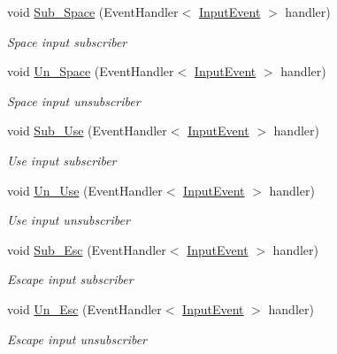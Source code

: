 \begin{DoxyCompactItemize}
void \mbox{\hyperlink{class_g_m_t_b_1_1_input_system_1_1_input___manager_a44d48f4c8117d99c53bed41b4baa08fd}{Sub\+\_\+\+Space}} (Event\+Handler$<$ \mbox{\hyperlink{class_g_m_t_b_1_1_input_system_1_1_input_event}{Input\+Event}} $>$ handler)
\begin{DoxyCompactList}\small\item\em Space input subscriber \end{DoxyCompactList}\item 
void \mbox{\hyperlink{class_g_m_t_b_1_1_input_system_1_1_input___manager_a6d9a4033204bd3c03faa7e86c67e0ed2}{Un\+\_\+\+Space}} (Event\+Handler$<$ \mbox{\hyperlink{class_g_m_t_b_1_1_input_system_1_1_input_event}{Input\+Event}} $>$ handler)
\begin{DoxyCompactList}\small\item\em Space input unsubscriber \end{DoxyCompactList}\item 
void \mbox{\hyperlink{class_g_m_t_b_1_1_input_system_1_1_input___manager_a52bf5b862a2139cb93b08dd3d68ff4cc}{Sub\+\_\+\+Use}} (Event\+Handler$<$ \mbox{\hyperlink{class_g_m_t_b_1_1_input_system_1_1_input_event}{Input\+Event}} $>$ handler)
\begin{DoxyCompactList}\small\item\em Use input subscriber \end{DoxyCompactList}\item 
void \mbox{\hyperlink{class_g_m_t_b_1_1_input_system_1_1_input___manager_a176df04c04e24ecb9577789c0ff03696}{Un\+\_\+\+Use}} (Event\+Handler$<$ \mbox{\hyperlink{class_g_m_t_b_1_1_input_system_1_1_input_event}{Input\+Event}} $>$ handler)
\begin{DoxyCompactList}\small\item\em Use input unsubscriber \end{DoxyCompactList}\item 
void \mbox{\hyperlink{class_g_m_t_b_1_1_input_system_1_1_input___manager_adf40d6cb8cb0df480fe10675ba230786}{Sub\+\_\+\+Esc}} (Event\+Handler$<$ \mbox{\hyperlink{class_g_m_t_b_1_1_input_system_1_1_input_event}{Input\+Event}} $>$ handler)
\begin{DoxyCompactList}\small\item\em Escape input subscriber \end{DoxyCompactList}\item 
void \mbox{\hyperlink{class_g_m_t_b_1_1_input_system_1_1_input___manager_a949303424f450dabf798922c7868c9e7}{Un\+\_\+\+Esc}} (Event\+Handler$<$ \mbox{\hyperlink{class_g_m_t_b_1_1_input_system_1_1_input_event}{Input\+Event}} $>$ handler)
\begin{DoxyCompactList}\small\item\em Escape input unsubscriber \end{DoxyCompactList}\end{DoxyCompactItemize}
